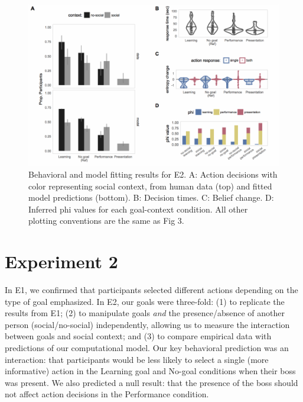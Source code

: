 \documentclass[10pt, letterpaper]{article}
\newenvironment{CodeChunk}{}{}
\begin{document}
\begin{CodeChunk}
\begin{figure}[tb]

{\centering \includegraphics[width=0.95\linewidth]{figs/e2_results-1} 

}

\caption[Behavioral and model fitting results for E2]{Behavioral and model fitting results for E2. A: Action decisions with color representing social context, from human data (top) and fitted model predictions (bottom). B: Decision times. C: Belief change. D: Inferred phi values for each goal-context condition. All other plotting conventions are the same as Fig 3.}\label{fig:e2_results}
\end{figure}
\end{CodeChunk}

\section{Experiment 2}\label{experiment-2}

In E1, we confirmed that participants selected different actions
depending on the type of goal emphasized. In E2, our goals were
three-fold: (1) to replicate the results from E1; (2) to manipulate
goals \emph{and} the presence/absence of another person
(social/no-social) independently, allowing us to measure the interaction
between goals and social context; and (3) to compare empirical data with
predictions of our computational model. Our key behavioral prediction
was an interaction: that participants would be less likely to select a
single (more informative) action in the Learning goal and No-goal
conditions when their boss was present. We also predicted a null result:
that the presence of the boss should not affect action decisions in the
Performance condition.
\end{document}
